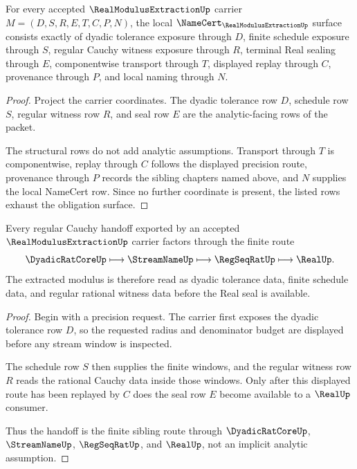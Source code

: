 \begin{theorem}
\label{thm:real-modulus-extraction-namecert-obligations}
For every accepted $\RealModulusExtractionUp$ carrier $M=(D,S,R,E,T,C,P,N)$, the local $\NameCert_{\RealModulusExtractionUp}$ surface consists exactly of dyadic tolerance exposure through $D$, finite schedule exposure through $S$, regular Cauchy witness exposure through $R$, terminal Real sealing through $E$, componentwise transport through $T$, displayed replay through $C$, provenance through $P$, and local naming through $N$.
\end{theorem}
\begin{proof}
Project the carrier coordinates. The dyadic tolerance row $D$, schedule row $S$, regular witness row $R$, and seal row $E$ are the analytic-facing rows of the packet.

The structural rows do not add analytic assumptions. Transport through $T$ is componentwise, replay through $C$ follows the displayed precision route, provenance through $P$ records the sibling chapters named above, and $N$ supplies the local NameCert row. Since no further coordinate is present, the listed rows exhaust the obligation surface.
\end{proof}

\begin{theorem}
\label{thm:real-modulus-extraction-regular-cauchy-handoff}
Every regular Cauchy handoff exported by an accepted $\RealModulusExtractionUp$ carrier factors through the finite route
$$
\DyadicRatCoreUp \longmapsto \StreamNameUp \longmapsto \RegSeqRatUp \longmapsto \RealUp .
$$
The extracted modulus is therefore read as dyadic tolerance data, finite schedule data, and regular rational witness data before the Real seal is available.
\end{theorem}
\begin{proof}
Begin with a precision request. The carrier first exposes the dyadic tolerance row $D$, so the requested radius and denominator budget are displayed before any stream window is inspected.

The schedule row $S$ then supplies the finite windows, and the regular witness row $R$ reads the rational Cauchy data inside those windows. Only after this displayed route has been replayed by $C$ does the seal row $E$ become available to a $\RealUp$ consumer.

Thus the handoff is the finite sibling route through $\DyadicRatCoreUp$, $\StreamNameUp$, $\RegSeqRatUp$, and $\RealUp$, not an implicit analytic assumption.
\end{proof}

